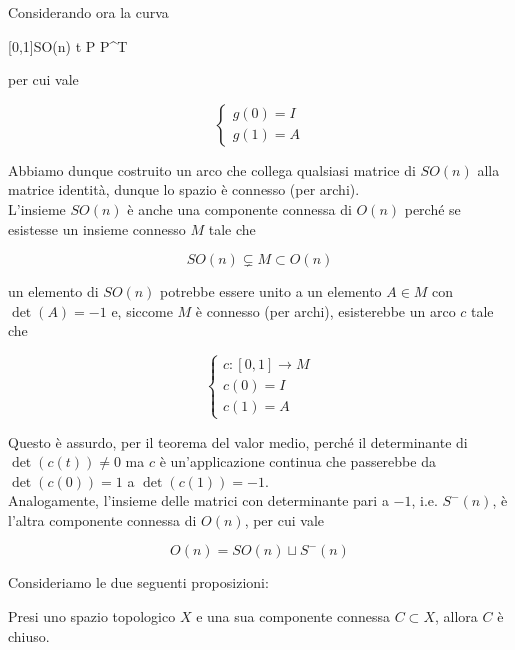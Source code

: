 Considerando ora la curva

%
	{[0,1]}{SO(n)}%
	{t}{ P  P^{T} %
	}

per cui vale

\begin{equation}
	\begin{cases}
		g(0) = I \\
		g(1) = A
	\end{cases}
\end{equation}

Abbiamo dunque costruito un arco che collega qualsiasi matrice di $ SO(n) $ alla matrice identità, dunque lo spazio è connesso (per archi).\\
L'insieme $ SO(n) $ è anche una componente connessa di $ O(n) $ perché se esistesse un insieme connesso $ M $ tale che

\begin{equation}
	SO(n) \subsetneq M \subset O(n)
\end{equation}

un elemento di $ SO(n) $ potrebbe essere unito a un elemento $ A \in M $ con $ \det(A) = -1 $ e, siccome $ M $ è connesso (per archi), esisterebbe un arco $ c $ tale che

\begin{equation}
	\begin{cases}
		c : [0,1] \to M \\
		c(0) = I \\
		c(1) = A
	\end{cases}
\end{equation}

Questo è assurdo, per il teorema del valor medio, perché il determinante di $ \det(c(t)) \neq 0 $ ma $ c $ è un'applicazione continua che passerebbe da $ \det(c(0)) = 1 $ a $ \det(c(1)) = -1 $.\\
Analogamente, l'insieme delle matrici con determinante pari a $ -1 $, i.e. $ S^{-}(n) $, è l'altra componente connessa di $ O(n) $, per cui vale

\begin{equation}
	O(n) = SO(n) \sqcup S^{-}(n)
\end{equation}

Consideriamo le due seguenti proposizioni:

\begin{definition}
	Presi uno spazio topologico $ X $ e una sua componente connessa $ C \subset X $, allora $ C $ è chiuso.
\end{definition}

